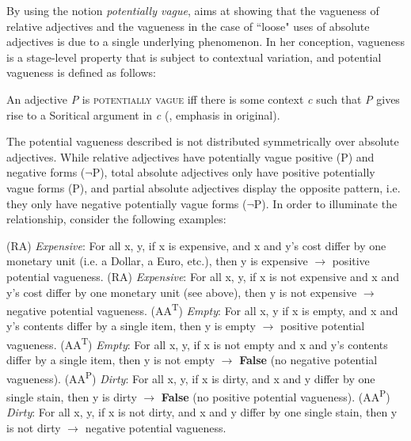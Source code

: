 \documentclass[output=paper]{langsci/langscibook}
\begin{document}
By using the notion \textit{potentially vague}, \textcite[49]{Burnett2017} aims at showing that the vagueness of relative adjectives and the vagueness in the case of ``loose" uses of absolute adjectives is due to a single underlying phenomenon. In her conception, vagueness is a stage-level property that is subject to contextual variation, and potential vagueness is defined as follows:

\ea \label{ex:harris:9}
	An adjective \textit{P} is \textsc{potentially vague} iff there is some context \textit{c} such that \textit{P} gives rise to a Soritical argument in \textit{c} (\textcite[50]{Burnett2017}, emphasis in original). %
\z

The potential vagueness described is not distributed symmetrically over absolute adjectives. While relative adjectives have potentially vague positive (P) and negative forms ($\neg$P), total absolute adjectives only have positive potentially vague forms (P), and partial absolute adjectives display the opposite pattern, i.e. they only have negative potentially vague forms ($\neg$P). In order to illuminate the relationship, consider the following examples: %

\ea \label{ex:harris:10}
	(RA) \textit{Expensive}: For all x, y, if x is expensive, and x and y's cost differ by one monetary unit (i.e. a Dollar, a Euro, etc.), then y is expensive {$\rightarrow$ \0} positive potential vagueness.
	\ex \label{ex:harris:11}
	(RA) \textit{Expensive}: For all x, y, if x is not expensive and x and y's cost differ by one monetary unit (see above), then y is not expensive {$\rightarrow$ \0} negative potential vagueness.
	\ex \label{ex:harris:12}
	(AA\textsuperscript{T}) \textit{Empty}: For all x, y if x is empty, and x and y's contents differ by a single item, then y is empty {$\rightarrow$ \0} positive potential vagueness.
	\ex \label{ex:harris:13}
	(AA\textsuperscript{T}) \textit{Empty}: For all x, y, if x is not empty and x and y's contents differ by a single item, then y is not empty {$\rightarrow$ \0} \textbf{False} (no negative potential vagueness).
	\ex \label{ex:harris:14}
	(AA\textsuperscript{P}) \textit{Dirty}: For all x, y, if x is dirty, and x and y differ by one single stain, then y is dirty {$\rightarrow$ \0} \textbf{False} (no positive potential vagueness).
	\ex \label{ex:harris:15}
	(AA\textsuperscript{P}) \textit{Dirty}: For all x, y, if x is not dirty, and x and y differ by one single stain, then y is not dirty {$\rightarrow$ \0} negative potential vagueness.
\z
\end{document}
